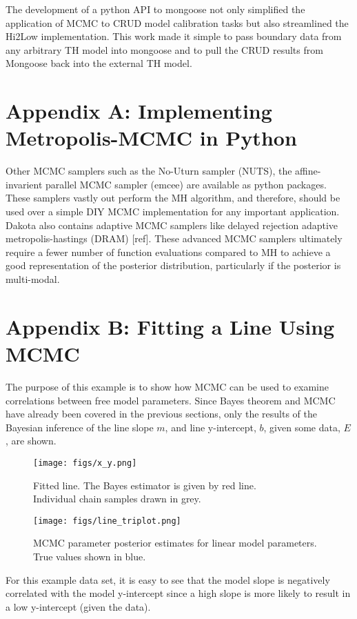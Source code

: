 \documentclass[10pt,a4paper]{report}
\begin{document}
The development of a python API to mongoose not only simplified the application of MCMC to CRUD model calibration tasks but also streamlined the Hi2Low implementation.  This work made it simple to pass boundary data from any arbitrary TH model into mongoose and to pull the CRUD results from Mongoose back into the external TH model.

\chapter{Appendix A: Implementing Metropolis-MCMC in Python}

\begin{tiny}

\end{tiny}


Other MCMC samplers such as the No-Uturn sampler (NUTS), the affine-invarient parallel MCMC sampler (emcee) are available as python packages.  These samplers vastly out perform the MH algorithm, and therefore, should be used over a simple DIY MCMC implementation for any important application.  Dakota also contains adaptive MCMC samplers like delayed rejection adaptive metropolis-hastings (DRAM) [ref].  These advanced MCMC samplers ultimately require a fewer number of function evaluations compared to MH to achieve a good representation of the posterior distribution, particularly if the posterior is multi-modal.

\chapter{Appendix B: Fitting a Line Using MCMC}

The purpose of this example is to show how MCMC can be used to examine correlations between free model parameters.  Since Bayes theorem and MCMC have already been covered in the previous sections, only the results of the Bayesian inference of the line slope $m$, and line y-intercept, $b$, given some data, $E$, are shown.


\begin{figure}[h]
    \centering
    \begin{minipage}{.5\textwidth}
    \texttt{[image: figs/x\_y.png]}
    \caption{Fitted line.  The Bayes estimator is given by red line. \\
     Individual chain samples drawn in grey.  \label{fig:x_y}}
    \end{minipage}%
    \begin{minipage}{.5\textwidth}
    \texttt{[image: figs/line\_triplot.png]}
    \caption{MCMC parameter posterior estimates for linear model parameters.  \\
    True values shown in blue.  \label{fig:line_triplot}}
    \end{minipage}
\end{figure}

For this example data set, it is easy to see that the model slope is negatively correlated with the model y-intercept since a high slope is more likely to result in a low y-intercept (given the data).
\end{document}
